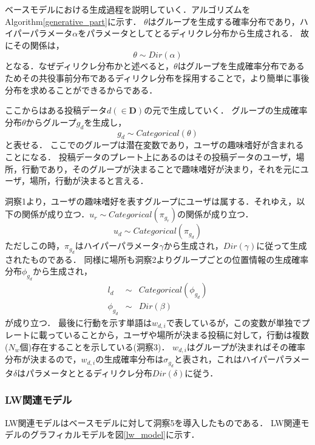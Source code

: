 \documentclass[a4j,10pt, twocolumn]{jarticle}
\begin{document}
ベースモデルにおける生成過程を説明していく．アルゴリズムをAlgorithm\ref{generative_part}に示す．
$\theta$はグループを生成する確率分布であり，ハイパーパラメータ$\alpha$をパラメータとしてとるディリクレ分布から生成される．
故にその関係は，
\begin{equation*}
  \theta \sim Dir(\alpha)
\end{equation*}
となる．なぜディリクレ分布かと述べると，$\theta$はグループを生成確率分布であるためその共役事前分布であるディリクレ分布を採用することで，より簡単に事後分布を求めることができるからである．

ここからはある投稿データ$d(\in \bm{D})$の元で生成していく．
グループの生成確率分布$\theta$からグループ$g_d$を生成し，
\begin{equation*}
  g_d \sim Categorical(\theta)
\end{equation*}
と表せる．
ここでのグループは潜在変数であり，ユーザの趣味嗜好が含まれることになる．
投稿データのプレート上にあるのはその投稿データのユーザ，場所，行動であり，そのグループが決まることで趣味嗜好が決まり，それを元にユーザ，場所，行動が決まると言える．

洞察1より，ユーザの趣味嗜好を表すグループにユーザは属する．それゆえ，以下の関係が成り立つ．$u_r \sim Categorical(\pi_{g_r})$の関係が成り立つ．
\begin{equation*}
  u_d \sim Categorical(\pi_{g_d})
\end{equation*}
ただしこの時，$\pi_{g_d}$はハイパーパラメータ$\gamma$から生成され，$Dir(\gamma)$に従って生成されたものである．
同様に場所も洞察2よりグループごとの位置情報の生成確率分布$\phi_{g_d}$から生成され，
\begin{eqnarray*}
  l_d & \sim & Categorical(\phi_{g_d}) \\
  \phi_{g_d} & \sim & Dir(\beta)
\end{eqnarray*}
が成り立つ．
最後に行動を示す単語は$w_{d, i}$で表しているが，この変数が単独でプレートに載っていることから，ユーザや場所が決まる投稿に対して，行動は複数($N_w$個)存在することを示している(洞察3)．
$w_{d,i}$はグループが決まればその確率分布が決まるので，$w_{d,i}$の生成確率分布は$\sigma_{g_d}$と表され，これはハイパーパラメータ$\delta$はパラメータととるディリクレ分布$Dir(\delta)$に従う．

\subsubsection{LW関連モデル}
LW関連モデルはベースモデルに対して洞察5を導入したものである．
LW関連モデルのグラフィカルモデルを図\ref{lw_model}に示す．
\end{document}
